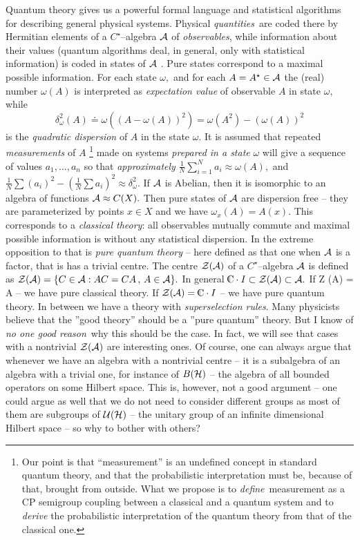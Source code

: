 \documentclass[12pt]{article}
\def\complex{{\kern .1em {\raise .47ex \hbox
{$\scriptscriptstyle
|$}}
\kern -.4em {\rm C}}}
\begin{document}
Quantum theory gives us a powerful formal language and
statistical algorithms for
describing general physical systems.
Physical {\sl quantities}\ are coded there by
Hermitian elements of a $C^{\star }$--algebra ${\cal A}$ of {\sl observables}, 
while information about their values  (quantum algorithms deal,  in general, 
only with statistical information)  is coded in states of 
${\cal A}$ .  Pure states correspond to a maximal possible information.  For
each state $\omega , $ and for each $A=A^{\star }\in {\cal A}$ the  (real)
number
$\omega
 (A)$ is interpreted as {\sl expectation value} of observable $A$ in state $
\omega , $ while 
$$
\delta _\omega ^2 (A)\doteq \omega  ( (A-\omega  (A))^2)=\omega 
 (A^2)- (\omega  (A))^2 
$$
is the {\sl quadratic dispersion} of $A$ in the state $\omega . $ It is assumed
that repeated {\sl measurements} of $A$
\footnote{Our point is that ``measurement'' is an undefined concept in
standard quantum theory, and that the probabilistic interpretation
must be, because of that, brought from outside. What we propose
is to {\sl define}\, measurement as a CP semigroup coupling between a
classical and a quantum system and to {\sl derive} the probabilistic
interpretation of the quantum theory from that of the classical one.}
made on systems 
{\sl prepared in a state} $
\omega $ will give a sequence of values $a_1, \ldots , a_n$ so that 
{\sl approximately} ${\frac
1N}\sum_{i=1}^Na_i\approx \omega  (A), $ and ${\frac 1N}\sum  (a_i)^2- ({\frac 1N
}\sum a_i)^2\approx \delta _\omega ^2. $ If ${\cal A}$ is Abelian,  then it is
isomorphic to an algebra of functions ${\cal A}\approx C (X). $ Then pure
states of ${\cal A}$ are dispersion free -- they are parameterized by points $
x\in X$ and we have $\omega _x (A)=A (x). $ This corresponds to a {\sl classical
theory}:  all observables mutually commute and maximal possible information
is without any statistical dispersion.  In the extreme opposition to that is
{\sl pure quantum theory} -- here defined as that one 
when ${\cal A}$ is a factor, that is has a trivial centre.  The centre
${\cal Z (A)}$ of a $C^\star$--algebra ${\cal A}$ is defined as
${\cal Z (A)}=\{C\in {\cal A}
: AC=CA\, , \, A\in {\cal A}\}. $ In general $\complex \cdot I\subset {\cal Z (A)}
\subset 
{\cal A}. $ If {\cal Z (A) = A} -- we have pure classical theory.  If ${\cal 
Z (A)}=\complex \cdot I$ -- we have pure quantum theory.  In between we have 
a theory
with {\sl superselection rules}.  Many physicists believe that the ''good
theory'' should be a ''pure quantum'' theory.  But I know of {\sl no one good
 reason}\
why this should be the case.  In fact,  we will see that cases with a
nontrivial ${\cal Z (A)}$ are interesting ones.  Of course,  one can always
argue that whenever we have an algebra with a nontrivial centre -- it is a
subalgebra of an algebra with a trivial one,  for instance of $B ({\cal H})$
-- the algebra of all bounded operators on some Hilbert space.  This is,
however, not a good argument -- one could argue as well that we do not need
to consider different groups as most of them are subgroups of ${\cal U (H)}$
-- the unitary group of an infinite dimensional Hilbert space -- so why
to bother with others?
\end{document}
